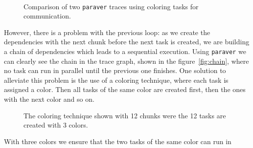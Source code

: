 \begin{figure}[h]
	\centering
	\\
	\caption{Comparison of two \texttt{paraver} traces using coloring tasks for 
	communication.}
\end{figure}
%
However, there is a problem with the previous loop: as we create the 
dependencies with the next chunk before the next task is created, we are 
building a chain of dependencies which leads to a sequential execution.  Using 
\texttt{paraver} we can clearly see the chain in the trace graph, shown in the 
figure~\ref{fig:chain}, where no task can run in parallel until the previous one 
finishes.  One solution to alleviate this problem is the use of a coloring 
technique, where each task is assigned a color.  Then all tasks of the same 
color are created first, then the ones with the next color and so on.
%
\begin{figure}[ht]
\centering
{}
\caption{The coloring technique shown with 12 chunks were the 12 tasks are 
created with 3 colors.}
\label{fig:coloring}
\end{figure}
%
With three colors we ensure that the two tasks of the same color can run in 
